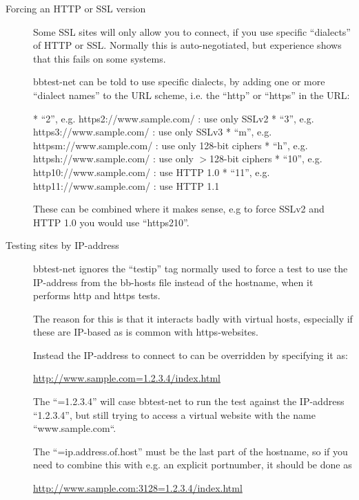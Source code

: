 \begin{description}
 

\item[Forcing an HTTP or SSL version] Some SSL sites will only allow
  you to connect, if you use specific ``dialects'' of HTTP or
  SSL. Normally this is auto-negotiated, but experience shows that
  this fails on some systems. 


  bbtest-net can be told to use specific dialects, by adding one or
  more ``dialect names'' to the URL scheme, i.e. the ``http'' or
  ``https'' in the URL: 



  * ``2'', e.g. https2://www.sample.com/ : use only SSLv2  
 * ``3'', e.g. https3://www.sample.com/ : use only SSLv3  
 * ``m'', e.g. httpsm://www.sample.com/ : use only 128-bit ciphers  
 * ``h'', e.g. httpsh://www.sample.com/ : use only $>$128-bit ciphers  
 * ``10'', e.g. http10://www.sample.com/ : use HTTP 1.0  
 * ``11'', e.g. http11://www.sample.com/ : use HTTP 1.1 


  These can be combined where it makes sense, e.g to force SSLv2 and HTTP 1.0 you would use ``https210''. 


 

\item[Testing sites by IP-address] bbtest-net ignores the ``testip''
  tag normally used to force a test to use the IP-address from the
  bb-hosts file instead of the hostname, when it performs http and
  https tests. 


  The reason for this is that it interacts badly with virtual hosts,
  especially if these are IP-based as is common with https-websites. 



  Instead the IP-address to connect to can be overridden by specifying it as: 


 \url{http://www.sample.com=1.2.3.4/index.html} 



  The ``=1.2.3.4'' will case bbtest-net to run the test against the
  IP-address ``1.2.3.4'', but still trying to access a virtual website
  with the name ``www.sample.com``. 



  The ``=ip.address.of.host'' must be the last part of the hostname, so if you need to combine this with e.g. an explicit portnumber, it should be done as 


 \url{http://www.sample.com:3128=1.2.3.4/index.html} 



 


\end{description}

